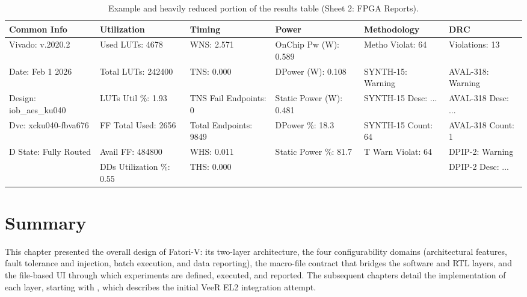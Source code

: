 \begin{table}[h]
\centering
\scriptsize
\setlength{\tabcolsep}{3.2pt}
\renewcommand{\arraystretch}{1.25}
\begin{tabularx}{\textwidth}{|X|X|X|X|X|X|}
\hline
\rowcolor{tableheader}\textbf{Common Info} &
\textbf{Utilization} &
\textbf{Timing} &
\textbf{Power} &
\textbf{Methodology} &
\textbf{DRC} \\
\hline
\hline
Vivado: v.2020.2 &
Used LUTs: 4678 &
WNS: 2.571 &
OnChip Pw (W): 0.589 &
Metho Violat: 64 &
Violations: 13 \\
\hline
Date: Feb 1 2026 &
Total LUTs: 242400 &
TNS: 0.000 &
DPower (W): 0.108 &
SYNTH-15: Warning &
AVAL-318: Warning \\
\hline
Design: iob\_aes\_ku040 &
LUTs Util \%: 1.93 &
TNS Fail Endpoints: 0 &
Static Power (W): 0.481 &
SYNTH-15 Desc: ... &
AVAL-318 Desc: ... \\
\hline
Dvc: xcku040-fbva676 &
FF Total Used: 2656 &
Total Endpoints: 9849 &
DPower \%: 18.3 &
SYNTH-15 Count: 64 &
AVAL-318 Count: 1 \\
\hline
D State: Fully Routed &
Avail FF: 484800 &
WHS: 0.011 &
Static Power \%: 81.7 &
T Warn Violat: 64 &
DPIP-2: Warning \\
\hline
&
DDs Utilization \%: 0.55 &
THS: 0.000 &
&
&
DPIP-2 Desc: ... \\
\hline
\end{tabularx}
\caption{Example and heavily reduced portion of the results table (Sheet 2: FPGA Reports).}
\label{tab:results_table_fpga_excerpt}
\end{table}

\section{Summary}
\label{chap3:summary}

This chapter presented the overall design of \ac{Fatori-V}: its two-layer architecture, the four configurability domains (architectural features, fault tolerance and injection, batch execution, and data reporting), the macro-file contract that bridges the software and \ac{RTL} layers, and the file-based \ac{UI} through which experiments are defined, executed, and reported. The subsequent chapters detail the implementation of each layer, starting with , which describes the initial VeeR EL2 integration attempt.
